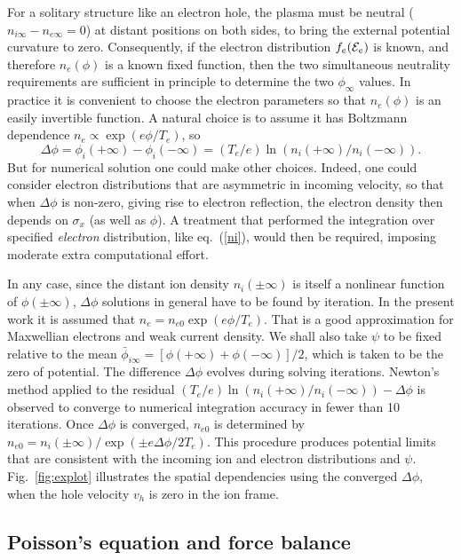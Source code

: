 \documentclass[12pt]{article}
\def\energy{{\cal E}}
\begin{document}
For a solitary structure like an electron hole, the plasma must be
neutral ($n_{i\infty}-n_{e\infty}=0$) at distant positions
on both sides, to bring the external potential curvature to
zero. Consequently, if the electron distribution $f_e(\energy_e)$ is
known, and therefore $n_e(\phi)$ is a known fixed function, then the
two simultaneous neutrality requirements are sufficient in principle
to determine the two $\phi_\infty$ values. In practice it is
convenient to choose the electron parameters so that $n_e(\phi)$ is an
easily invertible function. A natural choice is to assume it has
Boltzmann dependence $n_e\propto \exp(e\phi/T_e)$, so
\begin{equation}\label{fedist}
\Delta \phi=\phi_{i}(+\infty)-\phi_i(-\infty)=
(T_e/e)\ln(n_i(+\infty)/n_i(-\infty)).  
\end{equation}
But for numerical solution one could make other choices. Indeed, one
could consider electron distributions that are asymmetric in incoming
velocity, so that when $\Delta\phi$ is non-zero, giving rise to
electron reflection, the electron density then depends on $\sigma_x$ (as
well as $\phi$). A treatment that performed the integration over
specified \emph{electron} distribution, like eq.\ (\ref{ni}), would
then be required, imposing moderate extra computational effort.

In any case, since the distant ion density $n_i(\pm\infty)$ is itself
a nonlinear function of $\phi(\pm\infty)$, $\Delta\phi$ solutions in
general have to be found by iteration. In the present work it is
assumed that $n_e=n_{e0}\exp(e\phi/T_e)$. That is a good approximation
for Maxwellian electrons and weak current density. We shall also take
$\psi$ to be fixed relative to the mean
$\bar\phi_{i\infty}=[\phi(+\infty)+\phi(-\infty)]/2$, which is taken
to be the zero of potential. The difference $\Delta\phi$ evolves
during solving iterations. Newton's method applied to the residual
$(T_e/e)\ln(n_i(+\infty)/n_i(-\infty))-\Delta\phi$ is observed to
converge to numerical integration accuracy in fewer than
10 iterations. Once $\Delta\phi$ is converged, $n_{e0}$ is determined
by $n_{e0}=n_i(\pm\infty)/\exp(\pm e\Delta\phi/2T_e)$.  This procedure
produces potential limits that are consistent with the incoming ion
and electron distributions and $\psi$. Fig.\ \ref{fig:explot}
illustrates the spatial dependencies using the converged
$\Delta\phi$, when the hole velocity $v_h$ is zero in the ion frame.


\subsection{Poisson's equation and force balance}
\end{document}

